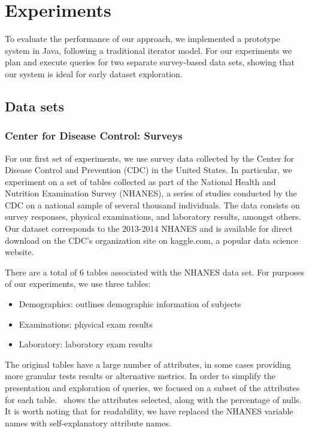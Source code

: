 \section{Experiments}\label{sec:experiments}
To evaluate the performance of our approach,  we implemented
a prototype system in Java, following a traditional iterator model.
For our experiments we plan and execute queries
for two separate survey-based data sets, showing that our system
is ideal for early dataset exploration.

\subsection{Data sets} \label{subsec:datasets}
\subsubsection{Center for Disease Control: Surveys}
For our first set of experiments, we use survey data collected by the 
Center for Disease Control and Prevention (CDC) in the United States. In particular, we
experiment on a set of tables collected as part of the National
Health and Nutrition Examination Survey (NHANES), a series of studies
conducted by the CDC on a national sample of several thousand individuals\cite{cdc-data}.
The data consists on survey responses, physical examinations, and laboratory
results, amongst others. Our dataset corresponds to the 2013-2014 NHANES
and is available for direct download on the CDC's organization site on 
kaggle.com, a popular data science website.

There are a total of 6 tables associated with the NHANES data set. For purposes
of our experiments, we use three tables:

\begin{itemize}
	\item Demographics: outlines demographic information of subjects
	\item Examinations: physical exam results
	\item Laboratory: laboratory exam results
\end{itemize}

The original tables have a large number of attributes, in some cases providing more granular
tests results or alternative metrics. In order to simplify the presentation and
exploration of queries, we focused on a subset of the attributes for each table.~
shows the attributes selected, along with the
percentage of nulls. It is worth noting that for readability, we have replaced the
NHANES variable names with self-explanatory attribute names.


